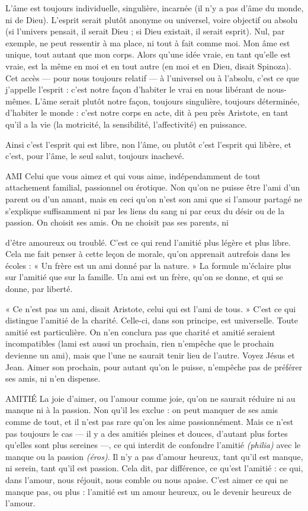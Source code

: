L'âme est toujours individuelle, singulière, incarnée (il n’y a pas d’âme du
monde, ni de Dieu). L'esprit serait plutôt anonyme ou universel, voire objectif
ou absolu (si l’univers pensait, il serait Dieu ; si Dieu existait, il serait esprit).
Nul, par exemple, ne peut ressentir à ma place, ni tout à fait comme moi. Mon
âme est unique, tout autant que mon corps. Alors qu’une idée vraie, en tant
qu’elle est vraie, est la même en moi et en tout autre (en moi et en Dieu, disait
Spinoza). Cet accès — pour nous toujours relatif — à l’universel ou à l'absolu,
c’est ce que j'appelle l'esprit : c’est notre façon d’habiter le vrai en nous libérant
de nous-mêmes. L'âme serait plutôt notre façon, toujours singulière, toujours
déterminée, d’habiter le monde : c’est notre corps en acte, dit à peu près Aristote,
en tant qu’il a la vie (la motricité, la sensibilité, l’affectivité) en puissance.

Ainsi c’est l'esprit qui est libre, non l’âme, ou plutôt c’est l'esprit qui libère,
et c’est, pour l’âme, le seul salut, toujours inachevé.

AMI Celui que vous aimez et qui vous aime, indépendamment de tout attachement
familial, passionnel ou érotique. Non qu'on ne puisse être
l'ami d’un parent ou d’un amant, mais en ceci qu’on n'est son ami que si
l'amour partagé ne s'explique suffisamment ni par les liens du sang ni par ceux
du désir ou de la passion. On choisit ses amis. On ne choisit pas ses parents, ni

d’être amoureux ou troublé. C’est ce qui rend l'amitié plus légère et plus libre.
Cela me fait penser à cette leçon de morale, qu’on apprenait autrefois dans les
écoles : « Un frère est un ami donné par la nature. » La formule m’éclaire plus
sur l'amitié que sur la famille. Un ami est un frère, qu’on se donne, et qui se
donne, par liberté.

« Ce n’est pas un ami, disait Aristote, celui qui est l’ami de tous. » C’est ce
qui distingue l’amitié de la charité. Celle-ci, dans son principe, est universelle.
Toute amitié est particulière. On n’en conclura pas que charité et amitié
seraient incompatibles (lami est aussi un prochain, rien n’empêche que le prochain
devienne un ami), mais que l’une ne saurait tenir lieu de l’autre. Voyez
Jésus et Jean. Aimer son prochain, pour autant qu’on le puisse, n'empêche pas
de préférer ses amis, ni n’en dispense.

AMITIÉ La joie d’aimer, ou l’amour comme joie, qu’on ne saurait réduire ni
au manque ni à la passion. Non qu’il les exclue : on peut manquer
de ses amis comme de tout, et il n’est pas rare qu’on les aime passionnément.
Mais ce n’est pas toujours le cas — il y a des amitiés pleines et douces, d’autant
plus fortes qu’elles sont plus sereines —, ce qui interdit de confondre l’amitié
{\it (philia)} avec le manque ou la passion {\it (éros)}. Il n’y a pas d’amour heureux, tant
qu’il est manque, ni serein, tant qu’il est passion. Cela dit, par différence, ce
qu'est l’amitié : ce qui, dans l’amour, nous réjouit, nous comble ou nous
apaise. C’est aimer ce qui ne manque pas, ou plus : l'amitié est un amour heureux,
ou le devenir heureux de l'amour.

